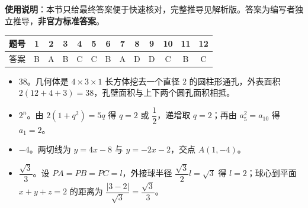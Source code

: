 
\begin{gknotice}
\textbf{使用说明}：本节只给最终答案便于快速核对，完整推导见解析版。答案为编写者独立推导，\textbf{非官方标准答案}。
\end{gknotice}

\begin{center}\begin{tabular}{ccccccccccccc}
\toprule
题号 & 1 & 2 & 3 & 4 & 5 & 6 & 7 & 8 & 9 & 10 & 11 & 12 \\
\midrule
答案 & B & A & B & C & C & B & A & D & D & C & B & C \\
\bottomrule
\end{tabular}\end{center}

\begin{itemize}[leftmargin=2.6em]
  \item[\textbf{13.}] $38$。几何体是 $4\times3\times1$ 长方体挖去一个直径 $2$ 的圆柱形通孔，外表面积 $2(12+4+3)=38$，孔壁面积与上下两个圆孔面积相抵。
  \item[\textbf{14.}] $2^n$。由 $2(1+q^2)=5q$ 得 $q=2$ 或 $\dfrac12$，递增取 $q=2$；再由 $a_5^2=a_{10}$ 得 $a_1=2$。
  \item[\textbf{15.}] $-4$。两切线为 $y=4x-8$ 与 $y=-2x-2$，交点 $A(1,-4)$。
  \item[\textbf{16.}] $\dfrac{\sqrt3}{3}$。设 $PA=PB=PC=l$，外接球半径 $\dfrac{\sqrt3}{2}l=\sqrt3$ 得 $l=2$；球心到平面 $x+y+z=2$ 的距离为 $\dfrac{|3-2|}{\sqrt3}=\dfrac{\sqrt3}{3}$。
\end{itemize}

